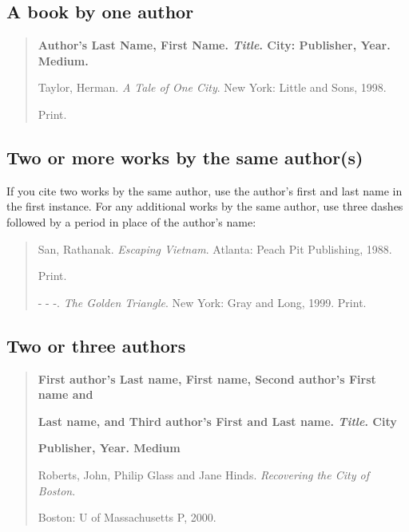 \subsection{A book by one author}

\begin{quote}
\textbf{Author's Last Name, First Name. \emph{Title}. City: Publisher, Year. Medium.}

\medskip

Taylor, Herman. \emph{A Tale of One City}. New York: Little and Sons, 1998.
 
\hspace{.4in}Print.
\end{quote}
 
\subsection{Two or more works by the same author(s)}

If you cite two works by the same author, use the author's first and last name in the first instance. For any additional works by the same author, use three dashes followed by a period in place of the
author's name:

\begin{quote}
San, Rathanak. \emph{Escaping Vietnam}. Atlanta: Peach Pit Publishing, 1988. 

\hspace{.4in}Print.

\medskip

- - -. \emph{The Golden Triangle}. New York: Gray and Long, 1999. Print.
\end{quote}


\subsection{Two or three authors}

\begin{quote}
\textbf{First author's Last name, First name, Second author's First name and}

\hspace{.4in}\textbf{Last name, and Third author's First and Last name. \emph{Title}. City}

\hspace{.4in}\textbf{Publisher, Year. Medium}
\medskip

Roberts, John, Philip Glass and Jane Hinds. \emph{Recovering the City of Boston}. 

\hspace{.4in}Boston: U of Massachusetts P, 2000.
\end{quote}

